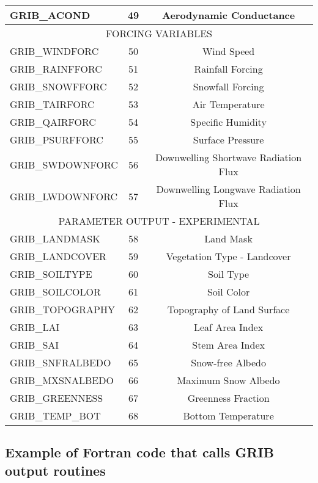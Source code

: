 \begin{longtable}{|l|c|c|}
  GRIB\_ACOND      & 49 & Aerodynamic Conductance \\
  \hline
  \multicolumn{3}{|c|}{FORCING VARIABLES} \\
  \hline
  GRIB\_WINDFORC   & 50 & Wind Speed \\
  GRIB\_RAINFFORC  & 51 & Rainfall Forcing \\
  GRIB\_SNOWFFORC  & 52 & Snowfall Forcing \\
  GRIB\_TAIRFORC   & 53 & Air Temperature \\
  GRIB\_QAIRFORC   & 54 & Specific Humidity \\
  GRIB\_PSURFFORC  & 55 & Surface Pressure \\
  GRIB\_SWDOWNFORC & 56 & Downwelling Shortwave Radiation Flux \\
  GRIB\_LWDOWNFORC & 57 & Downwelling Longwave Radiation Flux \\
  \hline
  \multicolumn{3}{|c|}{PARAMETER OUTPUT - EXPERIMENTAL} \\
  \hline
  GRIB\_LANDMASK   & 58 & Land Mask \\
  GRIB\_LANDCOVER  & 59 & Vegetation Type - Landcover\\
  GRIB\_SOILTYPE   & 60 & Soil Type \\
  GRIB\_SOILCOLOR  & 61 & Soil Color \\
  GRIB\_TOPOGRAPHY & 62 & Topography of Land Surface \\
  GRIB\_LAI        & 63 & Leaf Area Index \\
  GRIB\_SAI        & 64 & Stem Area Index \\
  GRIB\_SNFRALBEDO & 65 & Snow-free Albedo \\
  GRIB\_MXSNALBEDO & 66 & Maximum Snow Albedo \\
  GRIB\_GREENNESS  & 67 & Greenness Fraction \\
  GRIB\_TEMP\_BOT   & 68 & Bottom Temperature \\
  \hline
 \end{longtable}

\subsection{ Example of Fortran code that calls GRIB output routines }

